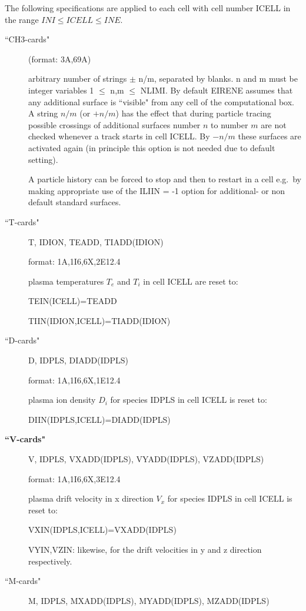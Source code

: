 The following specifications are applied to each cell with cell number ICELL in
the range  $INI \leq ICELL \leq INE$.
\begin{description}
  \item[``CH3-cards"] (format: 3A,69A) 

        arbitrary number of strings $\pm$ n/m, separated by blanks.
        n and
        m must be integer variables 1 $\le$ n,m $\le$ NLIMI.
        By default EIRENE assumes that any additional surface is ``visible" from any
        cell of the computational box.
        A string $n/m$ (or $+n/m$) has the effect that during particle tracing possible
        crossings of additional surfaces number $n$ to number $m$ are not checked
        whenever a track starts in cell ICELL.
        By $-n/m$ these surfaces are activated again (in principle this option is not
        needed due to default setting).

        A particle history can be forced to stop and then to restart in a cell e.g.\ by
        making appropriate use of the ILIIN = -1 option for additional- or non default
        standard surfaces.
  \item[``T-cards"] T, IDION, TEADD, TIADD(IDION) 

        format: 1A,1I6,6X,2E12.4 

        plasma temperatures $T_e $ and $T_i $ in cell ICELL are reset to:

        TEIN(ICELL)=TEADD 

        TIIN(IDION,ICELL)=TIADD(IDION)
  \item[``D-cards"] D, IDPLS, DIADD(IDPLS)

        format: 1A,1I6,6X,1E12.4 

        plasma ion density $D_i $ for species IDPLS in cell ICELL is reset to:

        DIIN(IDPLS,ICELL)=DIADD(IDPLS)
  \item[\textbf{``V-cards"}] V, IDPLS,
        VXADD(IDPLS), VYADD(IDPLS), VZADD(IDPLS) 

        format: 1A,1I6,6X,3E12.4 

        plasma drift velocity in x direction $V_x $ for species IDPLS in cell ICELL is
        reset to:

        VXIN(IDPLS,ICELL)=VXADD(IDPLS) 

        VYIN,VZIN: likewise, for the drift velocities in y and z direction
        respectively.
  \item[``M-cards"] M, IDPLS, MXADD(IDPLS), MYADD(IDPLS), MZADD(IDPLS)


\end{description}
